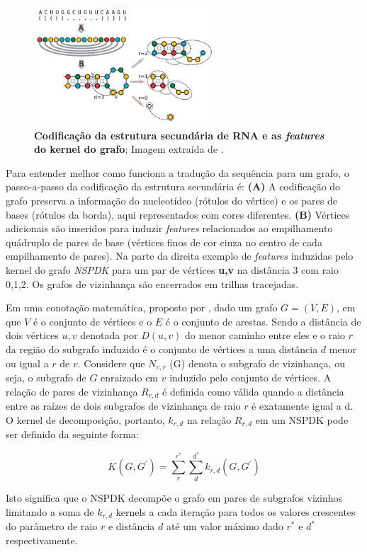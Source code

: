 \begin{figure}[h]
    \centering
    \includegraphics[width=0.6\textwidth]{images/eden_graph.png}
    \caption{\textbf{Codificação da estrutura secundária de RNA e as \textit{features} do kernel do grafo}; Imagem extraída de \cite{graph-representation}.}
    \label{fig:eden_graph}
\end{figure}

Para entender melhor como funciona a tradução da sequência para um grafo, o passo-a-passo da codificação da estrutura secundária é: \textbf{(A)} A codificação do grafo preserva a informação do nucleotídeo (rótulos do vértice) e os pares de bases (rótulos da borda), aqui representados com cores diferentes. \textbf{(B)} Vértices adicionais são inseridos para induzir \textit{features} relacionados ao empilhamento quádruplo de pares de base (vértices finos de cor cinza no centro de cada empilhamento de pares). Na parte da direita exemplo de \textit{features} induzidas pelo kernel do grafo \textit{NSPDK} para um par de vértices \textbf{u,v} na distância 3 com raio 0,1,2. Os grafos de vizinhança são encerrados em trilhas tracejadas.

Em uma conotação matemática, proposto por \cite{graph-representation}, dado um grafo $G = (V,E)$, em que $V$ é o conjunto de vértices e o $E$ é o conjunto de arestas. Sendo a distância de dois vértices $u,v$ denotada por $D(u, v)$ do menor caminho entre eles e o raio $r$ da região do subgrafo induzido é o conjunto de vértices a uma distância $d$ menor ou igual a $r$ de $v$. Considere que $N_{v,r}$ (G) denota o subgrafo de vizinhança, ou seja, o subgrafo de $G$ enraizado em $v$ induzido pelo conjunto de vértices. A relação de pares de vizinhança $R_{r,d}$ é definida como válida quando a distância entre as raízes de dois subgrafos de vizinhança de raio $r$ é exatamente igual a d. O kernel de decomposição, portanto, $k_{r,d}$ na relação $R_{r,d}$ em um NSPDK pode ser definido da seguinte forma: 

\begin{equation}
    K(G, G^{'}) = \sum_{r}^{r^{*}} \sum_{d}^{d^{*}}k_{r,d}(G, G^{'})
\end{equation}

Isto significa que o NSPDK decompõe o grafo em pares de subgrafos
vizinhos limitando a soma de $k_{r,d}$ kernels a cada iteração para todos os valores crescentes do parâmetro de raio $r$ e distância $d$ até um valor máximo dado $r^{*}$ e $d^{*}$ respectivamente.